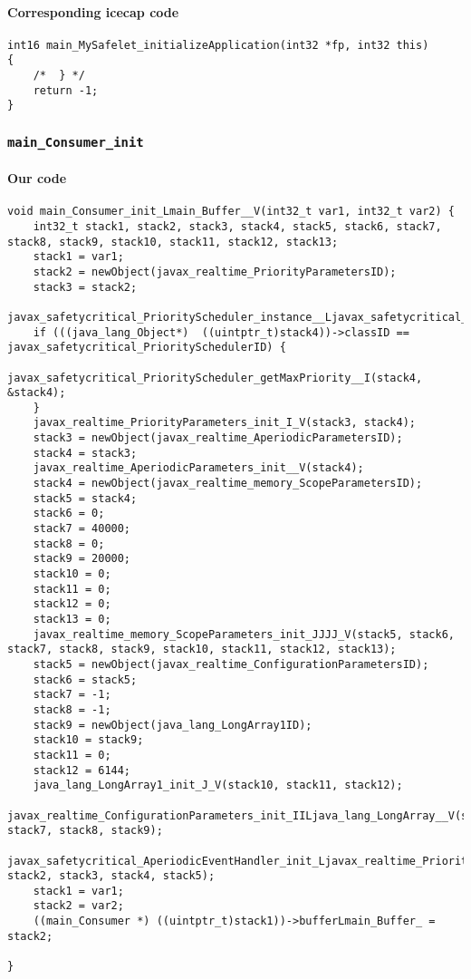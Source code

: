 \paragraph{Corresponding icecap code}\hfill
\begin{lstlisting}[firstnumber=56346]
int16 main_MySafelet_initializeApplication(int32 *fp, int32 this)
{
	/*	} */
	return -1;
}
\end{lstlisting}


\subsubsection{\texttt{main\_Consumer\_init}}

\paragraph{Our code}\hfill
\begin{lstlisting}[firstnumber=2426]
void main_Consumer_init_Lmain_Buffer__V(int32_t var1, int32_t var2) {
	int32_t stack1, stack2, stack3, stack4, stack5, stack6, stack7, stack8, stack9, stack10, stack11, stack12, stack13;
	stack1 = var1;
	stack2 = newObject(javax_realtime_PriorityParametersID);
	stack3 = stack2;
	javax_safetycritical_PriorityScheduler_instance__Ljavax_safetycritical_PriorityScheduler_(&stack4);
	if (((java_lang_Object*)  ((uintptr_t)stack4))->classID == javax_safetycritical_PrioritySchedulerID) {
		javax_safetycritical_PriorityScheduler_getMaxPriority__I(stack4, &stack4);
	}
	javax_realtime_PriorityParameters_init_I_V(stack3, stack4);
	stack3 = newObject(javax_realtime_AperiodicParametersID);
	stack4 = stack3;
	javax_realtime_AperiodicParameters_init__V(stack4);
	stack4 = newObject(javax_realtime_memory_ScopeParametersID);
	stack5 = stack4;
	stack6 = 0;
	stack7 = 40000;
	stack8 = 0;
	stack9 = 20000;
	stack10 = 0;
	stack11 = 0;
	stack12 = 0;
	stack13 = 0;
	javax_realtime_memory_ScopeParameters_init_JJJJ_V(stack5, stack6, stack7, stack8, stack9, stack10, stack11, stack12, stack13);
	stack5 = newObject(javax_realtime_ConfigurationParametersID);
	stack6 = stack5;
	stack7 = -1;
	stack8 = -1;
	stack9 = newObject(java_lang_LongArray1ID);
	stack10 = stack9;
	stack11 = 0;
	stack12 = 6144;
	java_lang_LongArray1_init_J_V(stack10, stack11, stack12);
	javax_realtime_ConfigurationParameters_init_IILjava_lang_LongArray__V(stack6, stack7, stack8, stack9);
	javax_safetycritical_AperiodicEventHandler_init_Ljavax_realtime_PriorityParameters_Ljavax_realtime_AperiodicParameters_Ljavax_realtime_memory_ScopeParameters_Ljavax_realtime_ConfigurationParameters__V(stack1, stack2, stack3, stack4, stack5);
	stack1 = var1;
	stack2 = var2;
	((main_Consumer *) ((uintptr_t)stack1))->bufferLmain_Buffer_ = stack2;

}
\end{lstlisting}

